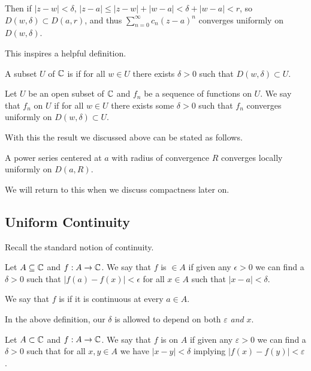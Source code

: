 \documentclass[a4paper]{scrartcl}
\begin{document}
Then if $|z - w| < \delta$, $|z - a| \leq |z - w| + |w - a| < \delta + |w - a| < r$, so $D(w, \delta) \subset D(a, r)$, and thus $\sum_{n =0}^{\infty} c_n (z - a)^n$ converges uniformly on $D(w, \delta)$.

This inspires a helpful definition.

\begin{definition}[Open]
    A subset $U$ of $\mathbb{C}$ is  if for all $w \in U$ there exists $\delta > 0$ such that $D(w, \delta) \subset U$.
\end{definition}

\begin{definition}
    Let $U$ be an open subset of $\mathbb{C}$ and $f_n$ be a sequence of functions on $U$. We say that $f_n$  on $U$ if for all $w \in U$ there exists some $\delta > 0$ such that $f_n$ converges uniformly on $D(w, \delta) \subset U$.  
\end{definition}

With this the result we discussed above can be stated as follows.

\begin{theorem}
    A power series centered at $a$ with radius of convergence $R$ converges locally uniformly on $D(a, R)$.
\end{theorem}

We will return to this when we discuss compactness later on.

\subsection{Uniform Continuity}

Recall the standard notion of continuity.

\begin{definition}[Continuity]
	Let $A \subseteq \mathbb{C}$ and $f: A \rightarrow \mathbb{C}$. We say that $f$ is  $\in A$ if given any $\epsilon > 0$ we can find a $\delta > 0$ such that $|f(a) - f(x)| < \epsilon$ for all $x \in A$ such that $|x -a | < \delta$.


	We say that $f$ is  if it is continuous at every $a \in A$.
\end{definition}

In the above definition, our $\delta$ is allowed to depend on both $\varepsilon$ \emph{and} $x$.

\begin{definition}
    Let $A \subset \mathbb{C}$ and $f: A \rightarrow \mathbb{C}$. We say that $f$ is  on $A$ if given any $\varepsilon > 0$ we can find a $\delta > 0$ such that for all $x, y \in A$ we have $|x - y| < \delta$ implying $|f(x) - f(y)| < \varepsilon$.
\end{definition}
\end{document}
